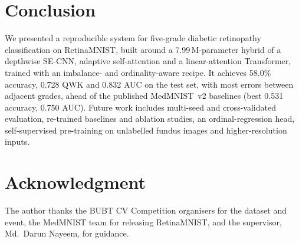 \documentclass[10pt,twocolumn]{article}
\begin{document}
\section{Conclusion}
We presented a reproducible system for five-grade diabetic retinopathy classification on RetinaMNIST, built around a 7.99\,M-parameter hybrid of a depthwise SE-CNN, adaptive self-attention and a linear-attention Transformer, trained with an imbalance- and ordinality-aware recipe. It achieves 58.0\% accuracy, 0.728 QWK and 0.832 AUC on the test set, with most errors between adjacent grades, ahead of the published MedMNIST~v2 baselines (best 0.531 accuracy, 0.750 AUC). Future work includes multi-seed and cross-validated evaluation, re-trained baselines and ablation studies, an ordinal-regression head, self-supervised pre-training on unlabelled fundus images and higher-resolution inputs.

\section*{Acknowledgment}
The author thanks the BUBT CV Competition organisers for the dataset and event, the MedMNIST team for releasing RetinaMNIST, and the supervisor, Md.\ Darun Nayeem, for guidance.
\end{document}
